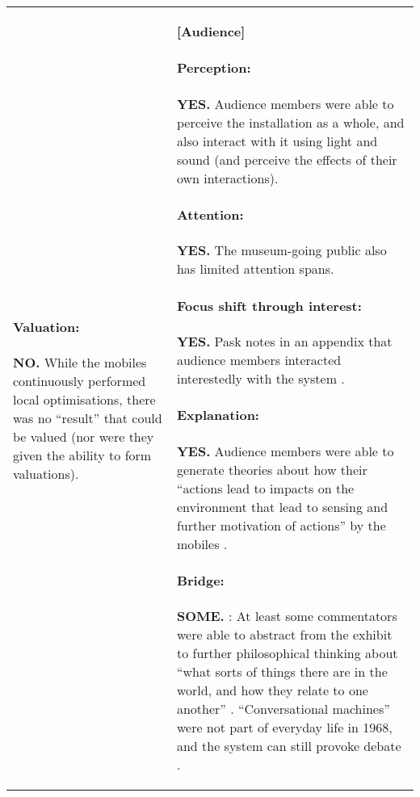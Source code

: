 \begin{table}
\begin{mdframed}
\begin{tabular}{@{\hspace{-0.01\textwidth}}p{}@{\hspace{.02\textwidth}}p{}}
\begin{minipage}{.48\textwidth}
\paragraph{Valuation:} \textbf{NO.} While the mobiles continuously performed
local optimisations, there was no ``result'' that could be valued (nor were
they given the ability to form valuations).
\end{minipage} &
\begin{minipage}{.48\textwidth}
\textbf{[Audience]}
\paragraph{Perception:} \textbf{YES.}
Audience members were able to perceive the installation as a whole,
and also interact with it using light and sound (and perceive the
effects of their own interactions). 
\paragraph{Attention:} \textbf{YES.}
The museum-going public also has limited attention spans.
\paragraph{Focus shift through interest:} \textbf{YES.}
Pask notes in an appendix 
that audience members interacted interestedly with the system \cite[p.~98]{pask1971comment}.
\paragraph{Explanation:} \textbf{YES.}
Audience members were able to generate theories about how
their ``actions lead to impacts on the environment that lead to
sensing and further motivation of actions'' by the mobiles
\cite{haque2007architectural}.
\paragraph{Bridge:} \textbf{SOME.} 
: 
At least some commentators were able to abstract from the exhibit to further philosophical thinking
about ``what sorts of things there are in the world, and how they
relate to one another'' \cite{pickering2007ontological}.
``Conversational machines'' were not part of everyday life in 1968,
and the system can still provoke debate \cite{pangaro2018serendipity}.

\end{minipage}
\end{tabular}
\end{mdframed}
\end{table}
